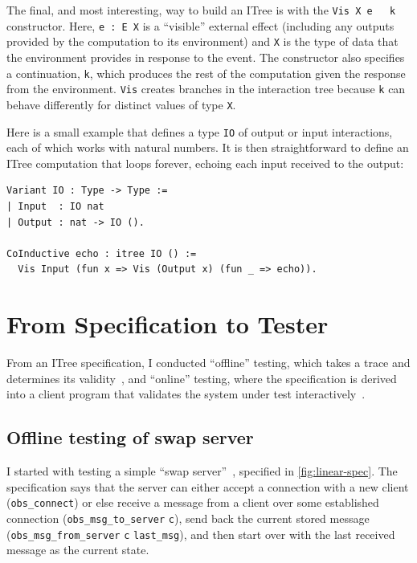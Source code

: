 \documentclass[12pt,oneside]{amsbook}
\newcommand{\ilc}[1]{\lstinline[style=customcoq]{#1}}
\numberwithin{section}{chapter}
\numberwithin{figure}{chapter}
\numberwithin{equation}{chapter}
\begin{document}
The final, and most interesting, way to build an ITree is with the \ilc{Vis X e
  k} constructor.  Here, \ilc{e : E X} is a ``visible'' external effect
(including any outputs provided by the computation to its environment) and
\ilc{X} is the type of data that the environment provides in response to the
event.  The constructor also specifies a continuation, \ilc{k}, which produces
the rest of the computation given the response from the environment.  \ilc{Vis}
creates branches in the interaction tree because \ilc{k} can behave differently
for distinct values of type \ilc{X}.

Here is a small example that defines a type \ilc{IO} of output or input
interactions, each of which works with natural numbers.  It is then
straightforward to define an ITree computation that loops forever, echoing each
input received to the output:

\begin{lstlisting}[style=customcoq]
Variant IO : Type -> Type :=
| Input  : IO nat
| Output : nat -> IO ().

CoInductive echo : itree IO () :=
  Vis Input (fun x => Vis (Output x) (fun _ => echo)).
\end{lstlisting}

\section{From Specification to Tester}
\label{sec:spec-to-test}
From an ITree specification, I conducted ``offline'' testing, which takes a
trace and determines its validity~\cite{cpp19}, and ``online'' testing, where
the specification is derived into a client program that validates the system
under test interactively~\cite{issta21}.

\subsection{Offline testing of swap server}
I started with testing a simple ``swap server''~\cite{cpp19}, specified in
\autoref{fig:linear-spec}.  The specification says that the server can either
accept a connection with a new client (\ilc{obs_connect}) or else receive a
message from a client over some established connection (\ilc{obs_msg_to_server}
\ilc{c}), send back the current stored message (\ilc{obs_msg_from_server}
\ilc{c} \ilc{last_msg}), and then start over with the last received message as
the current state.
\end{document}

